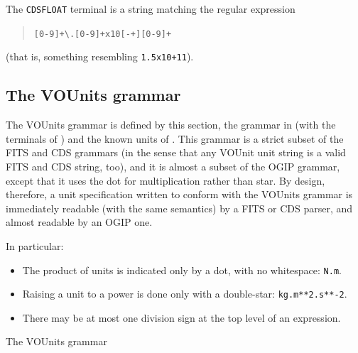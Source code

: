 \documentclass[11pt,notitlepage,onecolumn]{ivoa}
\begin{document}
The \texttt{CDSFLOAT} terminal is a string matching the regular
expression
\begin{quotation}
\texttt{[0-9]+\textbackslash.[0-9]+x10[-+][0-9]+}
\end{quotation}
(that is, something resembling \texttt{1.5x10+11}).




\subsection{The VOUnits grammar}
\label{appx:vougrammar}

The VOUnits grammar is defined by this section, the grammar in
 (with the terminals
of ) and the known units
of .  This grammar is a strict subset of
the FITS and CDS grammars (in the sense that any VOUnit unit string is a
valid FITS and CDS string, too), and it is almost a subset of the OGIP
grammar, except that it uses the dot for multiplication rather than
star.  By design, therefore, a unit specification written to conform
with the VOUnits grammar is immediately readable (with the same
semantics) by a FITS or CDS parser, and almost readable by an OGIP
one.

In particular:
\begin{itemize}
\item The product of units is indicated only by a dot, with no
  whitespace: \texttt{N.m}.
\item Raising a unit to a power is done only with a double-star:
  \texttt{kg.m**2.s**-2}.
\item There may be at most one division sign at the top level of an
  expression.
\end{itemize}

\begin{table}

\caption{\label{tabx:vougrammar}The VOUnits grammar}
\end{table}

\end{document}
